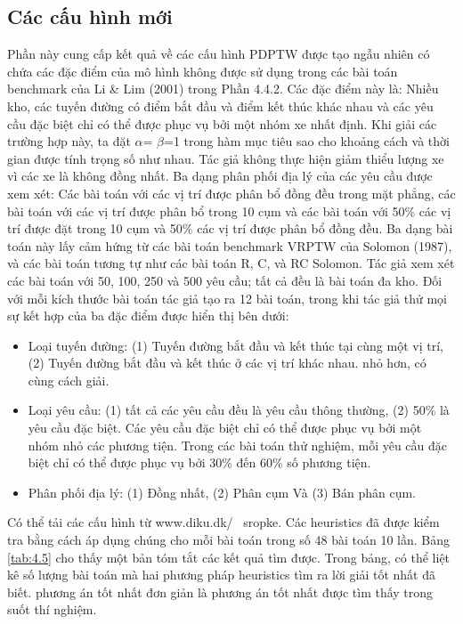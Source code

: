 \subsection{Các cấu hình mới}

Phần này cung cấp kết quả về các cấu hình PDPTW được tạo ngẫu nhiên có chứa các đặc điểm của mô hình không được sử dụng trong các bài toán benchmark của Li \& Lim (2001) trong Phần 4.4.2. Các đặc điểm này là: Nhiều kho, các tuyến đường có điểm bắt đầu và điểm kết thúc khác nhau và các yêu cầu đặc biệt chỉ có thể được phục vụ bởi một nhóm xe nhất định. Khi giải các trường hợp này, ta đặt $\alpha$= $\beta$=1 trong hàm mục tiêu sao cho khoảng cách và thời gian được tính trọng số như nhau. Tác giả không thực hiện giảm thiểu lượng xe vì các xe là không đồng nhất. 
Ba dạng phân phối địa lý của các yêu cầu được xem xét: Các bài toán với các vị trí được phân bổ đồng đều trong mặt phẳng, các bài toán với các vị trí được phân bổ trong 10 cụm và các bài toán với 50\% các vị trí được đặt trong 10 cụm và 50\% các vị trí được phân bổ đồng đều. Ba dạng bài toán này lấy cảm hứng từ các bài toán benchmark VRPTW của Solomon (1987), và các bài toán tương tự như các bài toán R, C, và RC Solomon. Tác giả xem xét các bài toán với 50, 100, 250 và 500 yêu cầu; tất cả đều là bài toán đa kho. Đối với mỗi kích thước bài toán tác giả tạo ra 12 bài toán, trong khi tác giả thử mọi sự kết hợp của ba đặc điểm được hiển thị bên dưới:
\begin{itemize}
    \item Loại tuyến đường: (1) Tuyến đường bắt đầu và kết thúc tại cùng một vị trí, (2) Tuyến đường bắt đầu và kết thúc ở các vị trí khác nhau.
    nhỏ hơn, có cùng cách giải.
    \item Loại yêu cầu: (1) tất cả các yêu cầu đều là yêu cầu thông thường, (2) 50\% là yêu cầu đặc biệt. Các yêu cầu đặc biệt chỉ có thể được phục vụ bởi một nhóm nhỏ các phương tiện. Trong các bài toán thử nghiệm, mỗi yêu cầu đặc biệt chỉ có thể được phục vụ bởi 30\% đến 60\% số phương tiện.
    \item Phân phối địa lý: (1) Đồng nhất, (2) Phân cụm Và (3) Bán phân cụm.
\end{itemize}
Có thể tải các cấu hình từ www.diku.dk/ ~sropke. Các heuristics đã được kiểm tra bằng cách áp dụng chúng cho mỗi bài toán trong số 48 bài toán 10 lần. Bảng \ref{tab:4.5} cho thấy một bản tóm tắt các kết quả tìm được. Trong bảng, có thể liệt kê số lượng bài toán mà hai phương pháp heuristics tìm ra lời giải tốt nhất đã biết. phương án tốt nhất đơn giản là phương án tốt nhất được tìm thấy trong suốt thí nghiệm.

